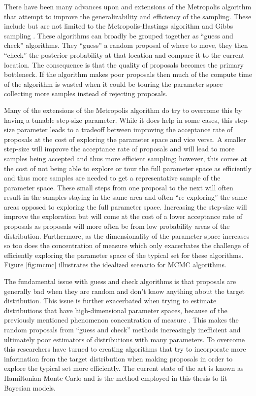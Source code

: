 There have been many advances upon and extensions of the Metropolis algorithm that attempt to improve the generalizability and efficiency of the sampling. These include but are not limited to the Metropolis-Hastings algorithm and Gibbs sampling \cite{Hastings1970} \cite{German1984}. These algorithms can broadly be grouped together as ``guess and check'' algorithms. They ``guess'' a random proposal of where to move, they then ``check'' the posterior probability at that location and compare it to the current location. The consequence is that the quality of proposals becomes the primary bottleneck. If the algorithm makes poor proposals then much of the compute time of the algorithm is wasted when it could be touring the parameter space collecting more samples instead of rejecting proposals.

Many of the extensions of the Metropolis algorithm do try to overcome this by having a tunable step-size parameter. While it does help in some cases, this step-size parameter leads to a tradeoff between improving the acceptance rate of proposals at the cost of exploring the parameter space and vice versa. A smaller step-size will improve the acceptance rate of proposals and will lead to more samples being accepted and thus more efficient sampling; however, this comes at the cost of not being able to explore or tour the full parameter space as efficiently and thus more samples are needed to get a representative sample of the parameter space. These small steps from one proposal to the next will often result in the samples staying in the same area and often ``re-exploring'' the same areas opposed to exploring the full parameter space. Increasing the step-size will improve the exploration but will come at the cost of a lower acceptance rate of proposals as proposals will more often be from low probability areas of the distribution. Furthermore, as the dimensionality of the parameter space increases so too does the concentration of measure which only exacerbates the challenge of efficiently exploring the parameter space of the typical set for these algorithms. Figure \ref{fig:mcmc} illustrates the idealized scenario for MCMC algorithms.

The fundamental issue with guess and check algorithms is that proposals are generally bad when they are random and don't know anything about the target distribution. This issue is further exacerbated when trying to estimate distributions that have high-dimensional parameter spaces, because of the previously mentioned phenomenon concentration of measure \cite{Betancourt2017} \cite{Carpenter2017}. This makes the random proposals from ``guess and check'' methods increasingly inefficient and ultimately poor estimators of distributions with many parameters. To overcome this researchers have turned to creating algorithms that try to incorporate more information from the target distribution when making proposals in order to explore the typical set more efficiently. The current state of the art is known as Hamiltonian Monte Carlo and is the method employed in this thesis to fit Bayesian models.

